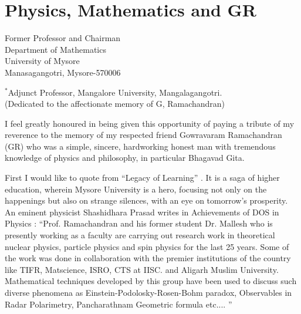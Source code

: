 \chapter[Physics, Mathematics and GR]{Physics, Mathematics and GR}\label{chap13}


\begin{center}
Former Professor and Chairman\\
Department of Mathematics\\
University of Mysore\\
Manasagangotri, Mysore-570006\\
\end{center}
\begin{center}
$^{*}$Adjunct Professor, Mangalore University, Mangalagangotri.\\
 (Dedicated to the affectionate memory of G, Ramachandran)
\end{center}

I feel greatly honoured in being given this opportunity of paying a tribute of my reverence to the memory of my respected friend Gowravaram Ramachandran (GR) who was a simple, sincere, hardworking honest man with tremendous knowledge of physics and philosophy, in particular Bhagavad Gita.

First I would like to quote from “Legacy of Learning” \cite{chap13-key01BSK}. It is a saga of higher education, wherein Mysore University is a hero, focusing not only on the happenings but also on strange silences, with an eye on tomorrow's prosperity. An eminent physicist Shashidhara Prasad writes in Achievements of DOS in Physics \cite{chap13-key02BSK}: “Prof. Ramachandran and his former student Dr. Mallesh who is presently working as a faculty are carrying out research work in theoretical nuclear physics, particle physics and spin physics for the last 25 years. Some of the work was done in collaboration with the premier institutions of the country like TIFR, Matscience, ISRO, CTS at IISC. and Aligarh Muslim University. Mathematical techniques developed by this group have been used to discuss such diverse phenomena as Einstein-Podolosky-Rosen-Bohm paradox, Observables in Radar Polarimetry, Pancharathnam Geometric formula etc.... ”

